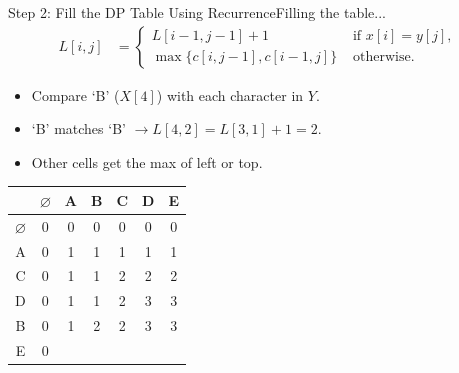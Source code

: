 \documentclass[aspectratio=169]{beamer}
\begin{document}
\begin{frame}{Step 2: Fill the DP Table Using Recurrence}{Filling the table...}
    \vspace{-10mm}
    \scriptsize
    \begin{equation*}
        \begin{align*}
            L[i, j] &=
                        \begin{cases}
                            L[i - 1, j - 1] + 1 & \text{ if } x[i] = y[j] \text{, } \\
                            \max \{ c[i, j - 1], c[i - 1, j] \} & \text{ otherwise.}
                        \end{cases}
        \end{align*}
    \end{equation*}
    \begin{itemize}
        \item Compare `B' ($X[4]$) with each character in $Y$.
        \item `B' matches `B' $\longrightarrow L[4,2] = L[3,1] + 1 = 2$.
        \item Other cells get the max of left or top.
    \end{itemize}
    \vspace{6mm}
    \normalsize
    \centering
    \begin{tabular}{|c|c|c|c|c|c|c|} \hline
                      & $\varnothing$ & A & B & C & D & E \\ \hline
        $\varnothing$ &        0      & 0 & 0 & 0 & 0 & 0 \\ \hline
               A      &        0      & 1 & 1 & 1 & 1 & 1 \\ \hline
               C      &        0      & 1 & 1 & 2 & 2 & 2 \\ \hline
               D      &        0      & 1 & 1 & 2 & 3 & 3 \\ \hline
               B      &        0      & 1 & 2 & 2 & 3 & 3 \\ \hline
               E      &        0      &   &   &   &   &   \\ \hline
    \end{tabular}
\end{frame}
\end{document}
